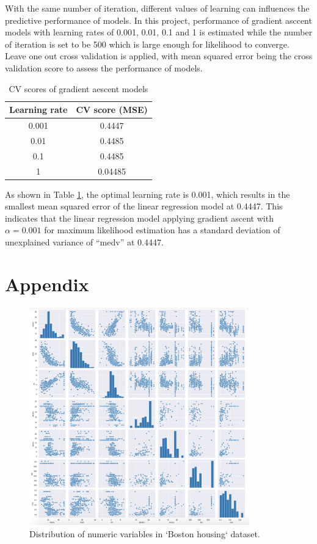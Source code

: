 \documentclass[letterpaper,12pt,twoside,]{pinp}
\begin{document}
With the same number of iteration, different values of learning can
influences the predictive performance of models. In this project,
performance of gradient asccent models with learning rates of 0.001,
0.01, 0.1 and 1 is estimated while the number of iteration is set to be
500 which is large enough for likelihood to converge. Leave one out
cross validation is applied, with mean squared error being the cross
validation score to assess the performance of models.

\begin{table}
\begin{tabular}{ |c|c| } 
\hline
\textbf{Learning rate} & \textbf{CV score (MSE)} \\
\hline
0.001 & 0.4447 \\
0.01 & 0.4485 \\
0.1 & 0.4485 \\
1 & 0.04485 \\
\hline
\end{tabular}
\centering
\caption{CV scores of gradient aescent models}
\label{table:cvScore}
\end{table}

As shown in Table \ref{table:cvScore}, the optimal learning rate is
0.001, which results in the smallest mean squared error of the linear
regression model at 0.4447. This indicates that the linear regression
model applying gradient ascent with \(\alpha=0.001\) for maximum
likelihood estimation has a standard deviation of unexplained variance
of ``medv'' at 0.4447.

\hypertarget{appendix-1}{%
\section{Appendix}\label{appendix-1}}

\begin{figure}[h]
\includegraphics[width=0.85\textwidth]{houseScatter.png}
\centering
\caption{Distribution of numeric variables in `Boston housing` dataset.}
\label{fig:houseScatter}
\end{figure}
\end{document}
